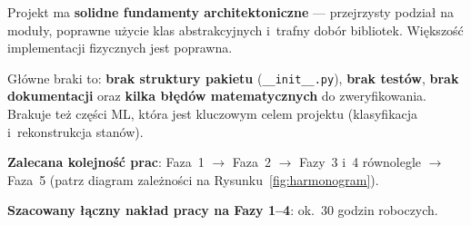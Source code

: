\documentclass[12pt,a4paper]{article}
\begin{document}
Projekt ma \textbf{solidne fundamenty architektoniczne} --- przejrzysty podział na moduły, poprawne użycie klas abstrakcyjnych i~trafny dobór bibliotek. Większość implementacji fizycznych jest poprawna.

Główne braki to: \textbf{brak struktury pakietu} (\texttt{\_\_init\_\_.py}), \textbf{brak testów}, \textbf{brak dokumentacji} oraz \textbf{kilka błędów matematycznych} do zweryfikowania. Brakuje też części ML, która jest kluczowym celem projektu (klasyfikacja i~rekonstrukcja stanów).

\textbf{Zalecana kolejność prac}: Faza~1 $\to$ Faza~2 $\to$ Fazy~3 i~4 równolegle $\to$ Faza~5 (patrz diagram zależności na Rysunku~\ref{fig:harmonogram}).

\textbf{Szacowany łączny nakład pracy na Fazy 1--4}: ok.~30 godzin roboczych.

\printbibliography[title={Bibliografia}]
\end{document}
